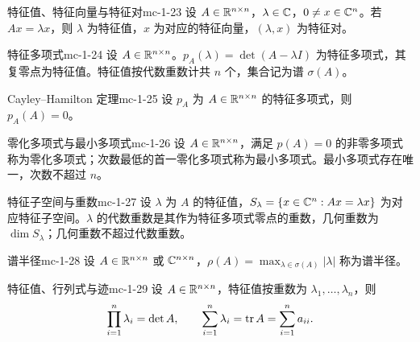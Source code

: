 \begin{definition}{特征值、特征向量与特征对}{mc-1-23}
设 $A\in\mathbb{R}^{n\times n}$，$\lambda\in\mathbb{C}$，$0\ne x\in\mathbb{C}^n$。若 $Ax=\lambda x$，则 $\lambda$ 为特征值，$x$ 为对应的特征向量，$(\lambda,x)$ 为特征对。
\end{definition}

\begin{definition}{特征多项式}{mc-1-24}
设 $A\in\mathbb{R}^{n\times n}$。$p_A(\lambda)=\det(A-\lambda I)$ 为特征多项式，其复零点为特征值。特征值按代数重数计共 $n$ 个，集合记为谱 $\sigma(A)$。
\end{definition}

\begin{theorem}{Cayley--Hamilton 定理}{mc-1-25}
设 $p_A$ 为 $A\in\mathbb{R}^{n\times n}$ 的特征多项式，则 $p_A(A)=0$。
\end{theorem}

\begin{definition}{零化多项式与最小多项式}{mc-1-26}
设 $A\in\mathbb{R}^{n\times n}$，满足 $p(A)=0$ 的非零多项式称为零化多项式；次数最低的首一零化多项式称为最小多项式。最小多项式存在唯一，次数不超过 $n$。
\end{definition}

\begin{definition}{特征子空间与重数}{mc-1-27}
设 $\lambda$ 为 $A$ 的特征值，$S_\lambda=\{x\in\mathbb{C}^n:Ax=\lambda x\}$ 为对应特征子空间。$\lambda$ 的代数重数是其作为特征多项式零点的重数，几何重数为 $\dim S_\lambda$；几何重数不超过代数重数。
\end{definition}

\begin{definition}{谱半径}{mc-1-28}
设 $A\in\mathbb{R}^{n\times n}$ 或 $\mathbb{C}^{n\times n}$，$\rho(A)=\max_{\lambda\in\sigma(A)}|\lambda|$ 称为谱半径。
\end{definition}

\begin{theorem}{特征值、行列式与迹}{mc-1-29}
设 $A\in\mathbb{R}^{n\times n}$，特征值按重数为 $\lambda_1,\ldots,\lambda_n$，则
\[\prod_{i=1}^n\lambda_i=\det A,\qquad\sum_{i=1}^n\lambda_i=\operatorname{tr} A=\sum_{i=1}^n a_{ii}.\]
\end{theorem}

